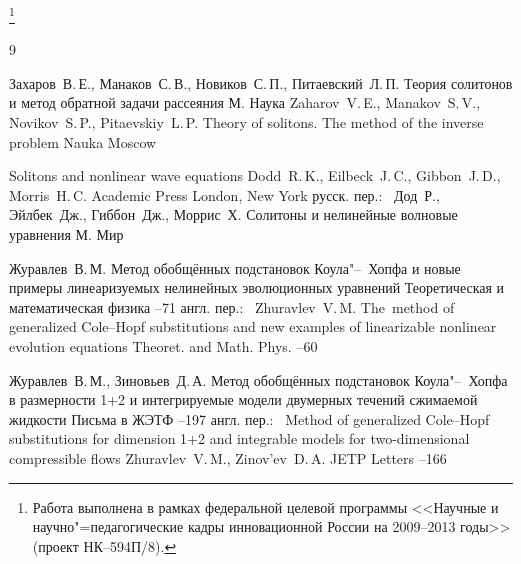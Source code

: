     \thanks{Работа выполнена в рамках федеральной целевой программы <<Научные и научно"=педагогические кадры инновационной России на 2009--2013 годы>> (проект  НК--594П/8).}

    \begin{thebibliography}{9}

    \by Захаров~В.\,Е., Манаков~С.\,В., Новиков~С.\,П., Питаевский~Л.\,П.
    \book Теория солитонов и метод обратной задачи
    рассеяния
    \publaddr М.
    \publ Наука
    \misctransl 
    \by Zaharov~V.\,E., Manakov~S.\,V., Novikov~S.\,P., Pitaevskiy~L.\,P.
    \book Theory of solitons. The method of the inverse problem
    \publ Nauka
    \publaddr Moscow

\book Solitons and nonlinear wave equations
\by Dodd~R.\,K., Eilbeck~J.\,C., Gibbon~J.\,D., Morris~H.\,C.
\publ Academic Press 
\publaddr London, New York
\rtransl русск. пер.:~    
    \by Дод~Р., Эйлбек~Дж., Гиббон~Дж., Моррис~Х.
    \book Солитоны и нелинейные волновые уравнения
    \publaddr М.
    \publ Мир

    \by Журавлев~В.\,М.
    \paper Метод обобщённых подстановок Коула"--~Хопфа и новые примеры линеаризуемых нелинейных эволюционных уравнений
    \jour Теоретическая и математическая физика
    --71
    \transl англ. пер.:~
    \by Zhuravlev~V.\,M.
\paper The~method of generalized Cole--Hopf substitutions and new examples of linearizable nonlinear evolution equations
\jour Theoret. and Math. Phys.
--60

    \by Журавлев~В.\,М., Зиновьев~Д.\,А.
    \paper Метод обобщённых подстановок Коула"--~Хопфа в размерности 1+2 и интегрируемые модели двумерных течений сжимаемой жидкости
    \jour Письма в ЖЭТФ
    --197
    \transl англ. пер.:~
\paper  Method of generalized Cole--Hopf substitutions for dimension 1+2 and integrable models for two-dimensional compressible flows
\by Zhuravlev~V.\,M., Zinov'ev~D.\,A.
\jour JETP Letters
--166


\end{thebibliography}


\hskip6.5cm \thedate \par
\hskip6.5cm\therevdate\par



\newpage




\makeengtitlem

\renewcommand{\baselinestretch}{0.9}

\newpage

%
